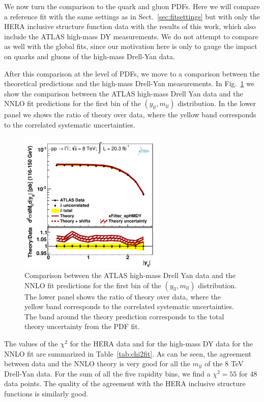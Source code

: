 We now turn the comparison to the quark and gluon PDFs.
%
Here we will compare a reference fit with the same settings as in Sect.~\ref{sec:fitsettings}
but with only the HERA inclusive structure function data with the results of this work,
which also include the ATLAS high-mass DY measurements.
%
We do not attempt to compare as well with the global fits, since our motivation here is only to
gauge the impact on quarks and gluons of the high-mass Drell-Yan data.

After this comparison at the level of PDFs, we move to a comparison between the theoretical
predictions and the high-mass Drell-Yan measurements.
%
In Fig.~\ref{hmDY_2D} we show the
comparison between the ATLAS high-mass Drell Yan data and the NNLO fit predictions
for the first bin of the $(y_{ll},m_{ll})$ distribution.
%
In the lower panel we shows the ratio of theory over data, where the yellow band
  corresponds to the correlated systematic uncertainties.

\begin{figure}[h]
\centering
\includegraphics[width=7cm]{figs/data_1.pdf} 
\caption{Comparison between the ATLAS high-mass Drell Yan data and the NNLO fit predictions
  for the first bin of the $(y_{ll},m_{ll})$ distribution.
  The lower panel shows the ratio of theory over data, where the yellow band
  corresponds to the correlated systematic uncertainties.
  The band around the theory prediction corresponds to the total
  theory uncertainty from the PDF fit.
}
\label{hmDY_2D}
\end{figure}

The values of the $\chi^2$ for the HERA data and for
the high-mass DY data for the NNLO fit
are summarized in Table~\ref{tab:chi2fit}.
%
As can be seen, the agreement between data and the NNLO theory
is very good for all the $m_{ll}$ of the 8 TeV Drell-Yan data.
%
For the sum of all the five rapidity bins, we find a $\chi^2=55$
for 48 data points.
%
The quality of the agreement with the HERA inclusive structure functions
is similarly good.

